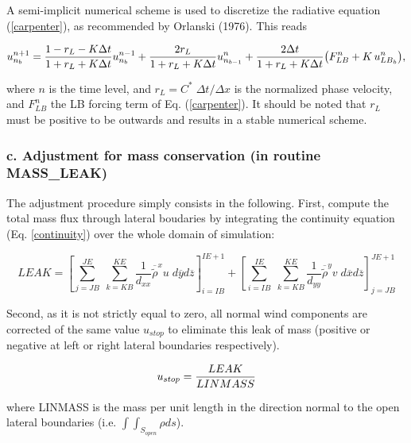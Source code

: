  A semi-implicit numerical scheme is used to discretize the
radiative equation (\ref{carpenter}), as recommended by Orlanski (1976).
This reads

\begin{equation}
u^{n+1}_{n_b} =  {1-r_L-K \Delta t \over 1+r_L+K \Delta t} u^{n-1}_{n_b}
               + {2 r_L            \over 1+r_L+K \Delta t} u^{n  }_{n_{b-1}}
               + {2 \Delta t       \over 1+r_L+K \Delta t}
                             {\left( F^{n}_{LB} +K \, u^{n}_{{LB}_b} \right)},
\end{equation}


\noindent
where $n$ is the time level, and
$r_L = C^* \; \Delta  t / \Delta x $ is the normalized phase
velocity, and $F^{n}_{LB}$ the LB forcing term of Eq. (\ref{carpenter}).
It should be noted that $r_L$ must be positive to be outwards
and results in a stable numerical scheme.

\subsubsection{c. Adjustment for mass conservation (in routine MASS\_LEAK)}

The adjustment procedure simply consists in the following.
First, compute the total mass flux through lateral boudaries by integrating
the continuity equation (Eq. \ref{continuity}) over the whole domain of simulation:

\begin{equation}
LEAK =
 \left[{ \sum_{j=JB}^{JE} \; \sum_{k=KB}^{KE}
 \dfrac{1}{d_{xx} } \overline{  {\tilde{\rho} } }^{x} u \;
d{\overline{y}} d{\overline{z}} }\right]_{i=IB}^{IE+1}
+\left[{ \sum_{i=IB}^{IE} \; \sum_{k=KB}^{KE}
 \dfrac{1}{d_{yy} } \overline{  {\tilde{\rho} } }^{y} v \;
d{\overline{x}} d{\overline{z}} }\right]_{j=JB}^{JE+1}
\end{equation}

Second, as it is not strictly equal to zero, all normal wind components are
corrected of the same value $u_{stop}$ to eliminate this leak of mass
(positive or negative at left or right lateral boundaries respectively).

\begin{equation}
u_{stop} = {LEAK \over LINMASS}
\end{equation}

\noindent where LINMASS is the mass per unit length
in the direction normal to the open
lateral boundaries (i.e. $\int \int_{S_{open}}\rho ds$).

